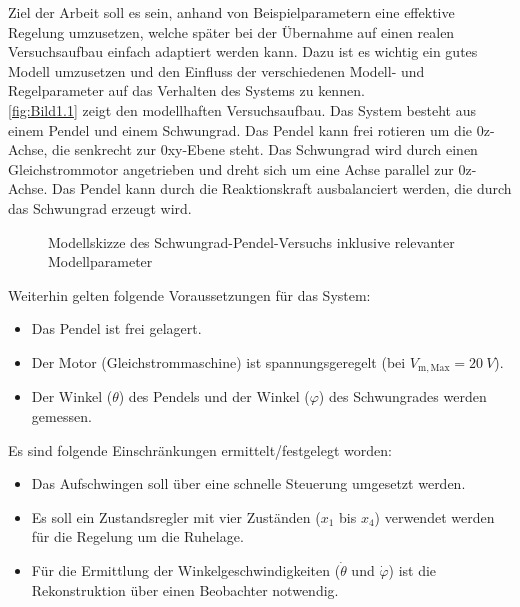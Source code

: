 Ziel der Arbeit soll es sein, anhand von Beispielparametern eine effektive Regelung umzusetzen, welche später bei der Übernahme auf einen realen Versuchsaufbau einfach adaptiert werden kann. Dazu ist es wichtig ein gutes Modell umzusetzen und den Einfluss der verschiedenen Modell- und Regelparameter auf das Verhalten des Systems zu kennen. \\

\autoref{fig:Bild1.1} zeigt den modellhaften Versuchsaufbau. Das System besteht aus einem Pendel und einem Schwungrad. Das Pendel kann frei rotieren um die 0z-Achse, die senkrecht zur 0xy-Ebene steht. Das Schwungrad wird durch einen Gleichstrommotor angetrieben und dreht sich um eine Achse parallel zur 0z-Achse. Das Pendel kann durch die Reaktionskraft ausbalanciert werden, die durch das Schwungrad erzeugt wird.

\begin{figure}[H]
   \centering
   \caption[Modellskizze des Versuchs]{Modellskizze des Schwungrad-Pendel-Versuchs inklusive relevanter Modellparameter}
   \label{fig:Bild1.1}
\end{figure}

Weiterhin gelten folgende Voraussetzungen für das System:

\begin{itemize}
    \item Das Pendel ist frei gelagert.
    \item Der Motor (Gleichstrommaschine) ist spannungsgeregelt (bei $V_{\mathrm{m,Max}} = \SI{20}{V}$).
    \item Der Winkel ($\theta$) des Pendels und der Winkel ($\varphi$) des Schwungrades werden gemessen.
\end{itemize}

Es sind folgende Einschränkungen ermittelt/festgelegt worden:

\begin{itemize}
    \item Das Aufschwingen soll über eine schnelle Steuerung umgesetzt werden.
    \item Es soll ein Zustandsregler mit vier Zuständen ($x_{\mathrm{1}}$ bis $x_{\mathrm{4}}$) verwendet werden für die Regelung um die Ruhelage.
    \item Für die Ermittlung der Winkelgeschwindigkeiten ($\dot\theta$ und $\dot\varphi$) ist die Rekonstruktion über einen Beobachter notwendig.
\end{itemize}
